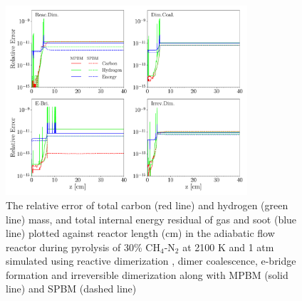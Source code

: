 \begin{figure}[H]
	\centering
	\includegraphics[width=0.8\textwidth]{Figures/Results/Validation/PFR/relerr_pfr.pdf}
	\caption{The relative error of total carbon (red line) and hydrogen (green line) mass, and total internal energy residual of gas and soot (blue line) plotted against reactor length (cm) in the adiabatic flow reactor during pyrolysis of 30\% $\mathrm{CH_4}$-$\mathrm{N_2}$ at 2100 K and 1 atm simulated using reactive dimerization , dimer coalescence, e-bridge formation and irreversible dimerization along with MPBM (solid line) and SPBM (dashed line)}
	\label{fig:pfrvalid}
\end{figure}